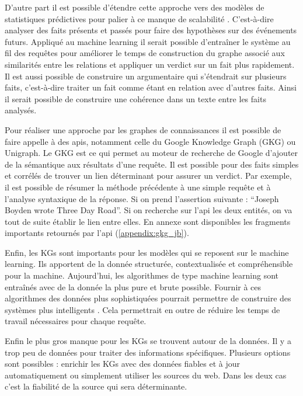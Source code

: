 D'autre part il est possible d'étendre cette approche vers des modèles de statistiques prédictives pour palier à ce manque de scalabilité \cite{wilcke2017knowledge}. C'est-à-dire analyser des faits présents et passés pour faire des hypothèses sur des événements futurs. Appliqué au machine learning il serait possible d'entraîner le système au fil des requêtes pour améliorer le temps de construction du graphe associé aux similarités entre les relations et appliquer un verdict sur un fait plus rapidement. Il est aussi possible de construire un argumentaire qui s'étendrait sur plusieurs faits, c'est-à-dire traiter un fait comme étant en relation avec d'autres faits. Ainsi il serait possible de construire une cohérence dans un texte entre les faits analysés.

Pour réaliser une approche par les graphes de connaissances il est possible de faire appelle à des apis, notamment celle du Google Knowledge Graph (GKG) ou Unigraph. Le GKG est ce qui permet au moteur de recherche de Google d'ajouter de la sémantique aux résultats d'une requête. Il est possible pour des faits simples et corrélés de trouver un lien déterminant pour assurer un verdict. Par exemple, il est possible de résumer la méthode précédente à une simple requête et à l'analyse syntaxique de la réponse. Si on prend l'assertion suivante : \enquote{Joseph Boyden wrote Three Day Road}. Si on recherche sur l'api les deux entités, on va tout de suite établir le lien entre elles. En annexe sont disponibles les fragments importants retournés par l'api (\ref{appendix:gkg_jb}). 

Enfin, les KGs sont importants pour les modèles qui se reposent sur le machine learning. Ils apportent de la donnée structurée, contextualisée et compréhensible pour la machine. Aujourd'hui, les algorithmes de type machine learning sont entraînés avec de la donnée la plus pure et brute possible. Fournir à ces algorithmes des données plus sophistiquées pourrait permettre de construire des systèmes plus intelligents \cite{nickel2016review}. Cela permettrait en outre de réduire les temps de travail nécessaires pour chaque requête.

Enfin le plus gros manque pour les KGs se trouvent autour de la données. Il y a trop peu de données pour traiter des informations spécifiques. Plusieurs options sont possibles : enrichir les KGs avec des données fiables et à jour automatiquement ou simplement utiliser les sources du web. Dans les deux cas c'est la fiabilité de la source qui sera déterminante.